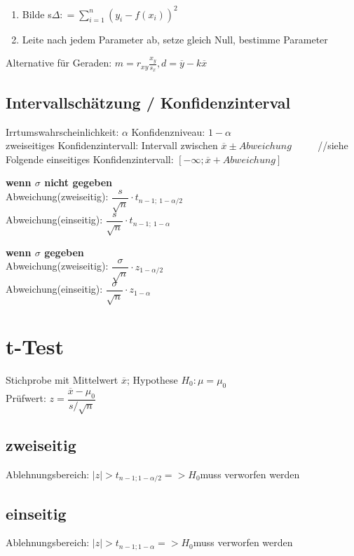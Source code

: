 \begin{enumerate}
\item Bilde s$\Delta : = \sum_{i=1}^n(y_i - f(x_i))^2$
\item Leite nach jedem Parameter ab, setze gleich Null, bestimme Parameter
\end{enumerate}

Alternative für Geraden: $m= r_{xy}\frac{x_y}{s_x}, d = \overline{y}-k\overline{x}$

\subsection*{Intervallschätzung / Konfidenzinterval}
Irrtumswahrscheinlichkeit: $\alpha$ 
Konfidenzniveau: $1-\alpha$\\

zweiseitiges Konfidenzintervall: Intervall zwischen $\overline{x} \pm Abweichung$ ~~~~ //siehe Folgende
einseitiges Konfidenzintervall: $[-\infty; \overline{x} + Abweichung]$

\textbf{wenn $\sigma$ nicht gegeben }\\
Abweichung(zweiseitig): $\dfrac{s}{\sqrt{n}} \cdot t_{n-1;~ 1-\alpha/2}$\\
Abweichung(einseitig): $\dfrac{s}{\sqrt{n}} \cdot t_{n-1;~ 1-\alpha}$

\textbf{wenn $\sigma$ gegeben}\\
Abweichung(zweiseitig): $\dfrac{\sigma}{\sqrt{n}}\cdot  z_{1-\alpha/2}$\\
Abweichung(einseitig): $\dfrac{\sigma}{\sqrt{n}} \cdot z_{1-\alpha}$


\section*{t-Test}
Stichprobe mit Mittelwert $\overline{x}$; Hypothese $H_0: \mu = \mu_0$\\
Prüfwert: $z= \dfrac{\overline{x} - \mu_0}{s/\sqrt{n}}$

\subsection*{zweiseitig}
Ablehnungsbereich: $|z| > t_{n-1;1-\alpha/2} => H_0 $muss verworfen werden 
\subsection*{einseitig}
Ablehnungsbereich: $|z| > t_{n-1;1-\alpha} => H_0 $muss verworfen werden 


